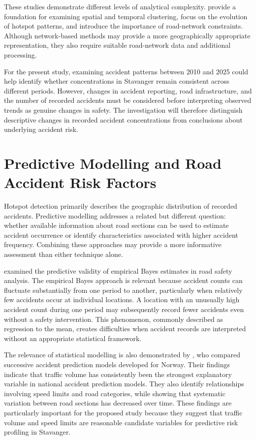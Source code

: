 These studies demonstrate different levels of analytical complexity. \textcite{Prasannakumar2011} provide a foundation for examining spatial and temporal clustering, \textcite{AlHamami2021} focus on the evolution of hotspot patterns, and \textcite{Romano2017} introduce the importance of road-network constraints. Although network-based methods may provide a more geographically appropriate representation, they also require suitable road-network data and additional processing.

For the present study, examining accident patterns between 2010 and 2025 could help identify whether concentrations in Stavanger remain consistent across different periods. However, changes in accident reporting, road infrastructure, and the number of recorded accidents must be considered before interpreting observed trends as genuine changes in safety. The investigation will therefore distinguish descriptive changes in recorded accident concentrations from conclusions about underlying accident risk.

\section{Predictive Modelling and Road Accident Risk Factors}
\label{sec:lit-topic-3}
Hotspot detection primarily describes the geographic distribution of recorded accidents. Predictive modelling addresses a related but different question: whether available information about road sections can be used to estimate accident occurrence or identify characteristics associated with higher accident frequency. Combining these approaches may provide a more informative assessment than either technique alone.

\textcite{Elvik2008} examined the predictive validity of empirical Bayes estimates in road safety analysis. The empirical Bayes approach is relevant because accident counts can fluctuate substantially from one period to another, particularly when relatively few accidents occur at individual locations. A location with an unusually high accident count during one period may subsequently record fewer accidents even without a safety intervention. This phenomenon, commonly described as regression to the mean, creates difficulties when accident records are interpreted without an appropriate statistical framework.

The relevance of statistical modelling is also demonstrated by \textcite{ElvikHoye2023}, who compared successive accident prediction models developed for Norway. Their findings indicate that traffic volume has consistently been the strongest explanatory variable in national accident prediction models. They also identify relationships involving speed limits and road categories, while showing that systematic variation between road sections has decreased over time. These findings are particularly important for the proposed study because they suggest that traffic volume and speed limits are reasonable candidate variables for predictive risk profiling in Stavanger.


